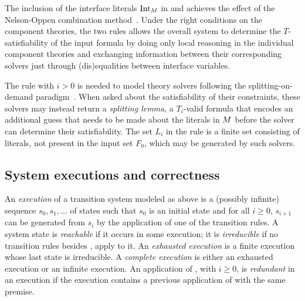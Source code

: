\documentclass{svjour3}                     %
\begin{document}
The inclusion of the interface literals $\mathrm{Int}_{M}$ 
in \decide and  achieves the effect of the Nelson-Oppen
combination method~\cite{BruCFGS-AMAI-09,TinHar-FROCOS-96}.
Under the right conditions on the component theories, 
the two rules allows the overall system to determine the $T$-satisfiability
of the input formula by doing only local reasoning in the individual 
component theories and exchanging information between their corresponding
solvers just through (dis)equalities between interface variables.

The rule  with $i > 0$ is needed to model theory solvers following 
the splitting-on-demand paradigm~\cite{BarNOT-LPAR-06}.
When asked about the satisfiability of their constraints,
these solvers may instead return a \emph{splitting lemma}, 
a $T_i$-valid formula that encodes an additional guess 
that needs to be made about the literals in $M$
before the solver can determine their satisfiability.
The set $L_i$ in the rule is a finite set consisting of literals, not present 
in the input set $F_0$, which may be generated by such solvers. 



\subsection{System executions and correctness}
An \emph{execution} of a transition system modeled as above
is a (possibly infinite) sequence $s_0, s_1, \ldots$ of states such that 
$s_0$ is an initial state and 
for all $i \geq 0$, $s_{i+1}$ can be generated from $s_i$ by the application 
of one of the transition rules.
A system state is \emph{reachable} if it occurs in some execution;
it is \emph{irreducible} if no transition rules besides , apply to it.
An \emph{exhausted execution} is a finite execution 
whose last state is irreducible.
A \emph{complete execution} is either an exhausted execution or an infinite execution.
An application of , with $i \geq 0$, is \emph{redundant} in an execution 
if the execution contains a previous application of 
with the same premise.
\end{document}
